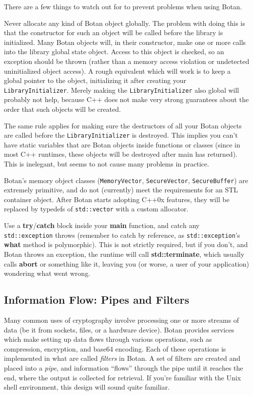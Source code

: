 \documentclass{article}
\newcommand{\function}[1]{\textbf{#1}}
\newcommand{\type}[1]{\texttt{#1}}
\begin{document}
There are a few things to watch out for to prevent problems when using Botan.

Never allocate any kind of Botan object globally. The problem with
doing this is that the constructor for such an object will be called
before the library is initialized. Many Botan objects will, in their
constructor, make one or more calls into the library global state
object. Access to this object is checked, so an exception should be
thrown (rather than a memory access violation or undetected
uninitialized object access). A rough equivalent which will work is to
keep a global pointer to the object, initializing it after creating
your \type{LibraryInitializer}. Merely making the
\type{LibraryInitializer} also global will probably not help, because
C++ does not make very strong guarantees about the order that such
objects will be created.

The same rule applies for making sure the destructors of all your
Botan objects are called before the \type{LibraryInitializer} is
destroyed. This implies you can't have static variables that are Botan
objects inside functions or classes (since in most C++ runtimes, these
objects will be destroyed after main has returned). This is inelegant,
but seems to not cause many problems in practice.

Botan's memory object classes (\type{MemoryVector},
\type{SecureVector}, \type{SecureBuffer}) are extremely primitive, and
do not (currently) meet the requirements for an STL container
object. After Botan starts adopting C++0x features, they will be
replaced by typedefs of \type{std::vector} with a custom allocator.

Use a \function{try}/\function{catch} block inside your
\function{main} function, and catch any \type{std::exception} throws
(remember to catch by reference, as \type{std::exception}'s
\function{what} method is polymorphic). This is not strictly required,
but if you don't, and Botan throws an exception, the runtime will call
\function{std::terminate}, which usually calls \function{abort} or
something like it, leaving you (or worse, a user of your application)
wondering what went wrong.

\subsection{Information Flow: Pipes and Filters}

Many common uses of cryptography involve processing one or more
streams of data (be it from sockets, files, or a hardware device).
Botan provides services which make setting up data flows through
various operations, such as compression, encryption, and base64
encoding. Each of these operations is implemented in what are called
\emph{filters} in Botan. A set of filters are created and placed into
a \emph{pipe}, and information ``flows'' through the pipe until it
reaches the end, where the output is collected for retrieval. If
you're familiar with the Unix shell environment, this design will
sound quite familiar.
\end{document}
